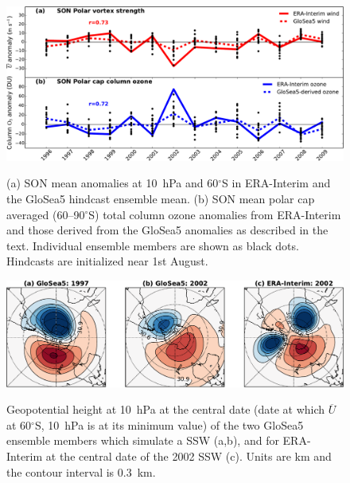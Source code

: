 \begin{figure}[t]
  \noindent\includegraphics[width=\textwidth,angle=0]{figures/GloSea5/zmzw_ozone_crop.pdf}\\
  \caption[GloSea5 forecast skill for the stratospheric polar vortex strength and column ozone.]{(a) SON mean anomalies at 10~hPa and 60$^{\circ}$S in ERA-Interim and the GloSea5 hindcast ensemble mean. (b) SON mean polar cap averaged (60--90$^{\circ}$S) total column ozone anomalies from ERA-Interim and those derived from the GloSea5  anomalies as described in the text. Individual ensemble members are shown as black dots. Hindcasts are initialized near 1st August.}\label{Fig2}
\end{figure}

\begin{figure}[t]
  \noindent\includegraphics[width=\textwidth,angle=0]{figures/GloSea5/ssws_crop.pdf}\\
  \caption[Comparison of GloSea5 and observed SSWs.]{Geopotential height at 10~hPa at the central  date (date at which $\overline{U}$ at 60$^{\circ}$S, 10~hPa is at its minimum value) of the two GloSea5 ensemble members which simulate a SSW (a,b), and for ERA-Interim at the central date of the 2002 SSW (c). Units are km and the contour interval is 0.3~km.}\label{Fig3}
\end{figure}

